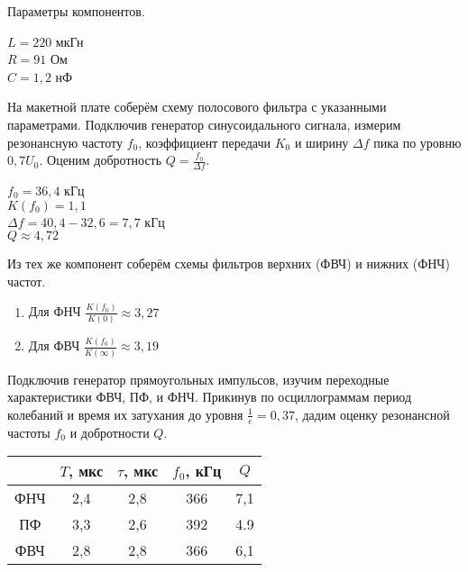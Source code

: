 	\noindent Параметры компонентов.

	\begin{center}
		$L = 220$ мкГн \\
		$R = 91$  Ом   \\
		$C = 1,2$ нФ   \\
	\end{center}

	\noindent На макетной плате соберём схему полосового фильтра с указанными параметрами. 
	Подключив генератор синусоидального сигнала, измерим резонансную частоту $f_0$, коэффициент передачи $K_0$ и ширину
	$\Delta f$ пика по уровню $0,7 U_0$. Оценим добротность $Q = \frac{f_0}{\Delta f}$.
	
	\begin{center}
		$f_0 = 36,4$ кГц                   \\
		$K(f_0) = 1,1$                     \\
		$\Delta f = 40,4 - 32,6 = 7,7$ кГц \\
		$Q \approx 4,72$
	\end{center}


	\noindent Из тех же компонент соберём схемы фильтров верхних (ФВЧ) и нижних (ФНЧ) частот.

	\begin{enumerate}
		\item Для ФНЧ $\frac{K(f_0)}{K(0)} \approx 3,27$
		\item Для ФВЧ $\frac{K(f_0)}{K(\infty)} \approx 3,19$
	\end{enumerate}


	\noindent Подключив генератор прямоугольных импульсов, изучим переходные характеристики
	ФВЧ, ПФ, и ФНЧ. Прикинув по осциллограммам период колебаний и время их затухания
	до уровня $\frac{1}{e} = 0,37$, дадим оценку резонансной частоты $f_0$ и добротности $Q$.

	\begin{table}[h!]
		\begin{center}
			\begin{tabular}{|c|c|c|c|c|}
				\hline
						& $T$, мкс  & $\tau$, мкс  & $f_0$, кГц  & $Q$   \\ \hline
				ФНЧ 	& 2,4       & 2,8          & 366         & 7,1   \\ \hline
				ПФ  	& 3,3       & 2,6          & 392         & 4.9   \\ \hline
				ФВЧ 	& 2,8       & 2,8          & 366         & 6,1   \\ \hline
			\end{tabular}
		\end{center}
	\end{table}

